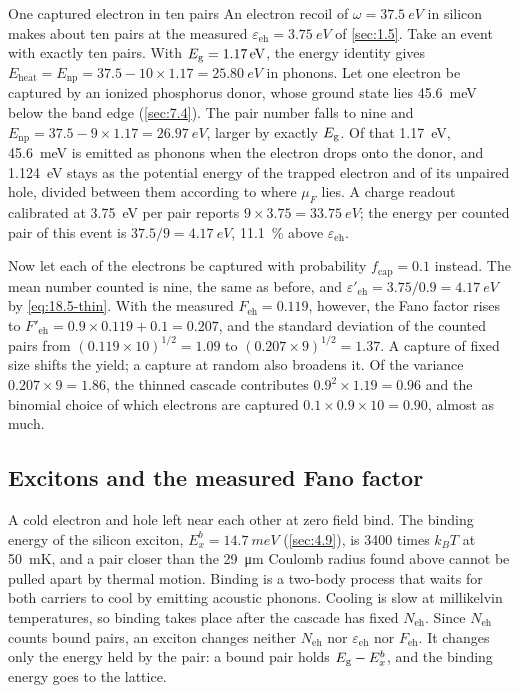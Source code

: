 \begin{workedexample}{One captured electron in ten pairs}\label{we:18-capture}
An electron recoil of $\omega = \SI{37.5}{eV}$ in silicon makes about ten pairs at the measured $\varepsilon_{\mathrm{eh}} = \SI{3.75}{eV}$ of \cref{sec:1.5}. Take an event with exactly ten pairs. With $E_{\mathrm{g}} = \SI{1.17}{eV}$, the energy identity gives $E_{\mathrm{heat}} = E_{\mathrm{np}} = 37.5 - 10\times1.17 = \SI{25.80}{eV}$ in phonons. Let one electron be captured by an ionized phosphorus donor, whose ground state lies \SI{45.6}{meV} below the band edge (\cref{sec:7.4}). The pair number falls to nine and $E_{\mathrm{np}} = 37.5 - 9\times1.17 = \SI{26.97}{eV}$, larger by exactly $E_{\mathrm{g}}$. Of that \SI{1.17}{eV}, \SI{45.6}{meV} is emitted as phonons when the electron drops onto the donor, and \SI{1.124}{eV} stays as the potential energy of the trapped electron and of its unpaired hole, divided between them according to where $\mu_F$ lies. A charge readout calibrated at \SI{3.75}{eV} per pair reports $9\times3.75 = \SI{33.75}{eV}$; the energy per counted pair of this event is $37.5/9 = \SI{4.17}{eV}$, \SI{11.1}{\percent} above $\varepsilon_{\mathrm{eh}}$.

Now let each of the electrons be captured with probability $f_{\mathrm{cap}} = 0.1$ instead. The mean number counted is nine, the same as before, and $\varepsilon'_{\mathrm{eh}} = 3.75/0.9 = \SI{4.17}{eV}$ by \cref{eq:18.5-thin}. With the measured $F_{\mathrm{eh}} = 0.119$, however, the Fano factor rises to $F'_{\mathrm{eh}} = 0.9\times0.119 + 0.1 = 0.207$, and the standard deviation of the counted pairs from $(0.119\times10)^{1/2} = 1.09$ to $(0.207\times9)^{1/2} = 1.37$. A capture of fixed size shifts the yield; a capture at random also broadens it. Of the variance $0.207\times9 = 1.86$, the thinned cascade contributes $0.9^2\times1.19 = 0.96$ and the binomial choice of which electrons are captured $0.1\times0.9\times10 = 0.90$, almost as much.
\end{workedexample}

\subsection{Excitons and the measured Fano factor}\label{sec:18.5-excitons}

A cold electron and hole left near each other at zero field bind. The binding energy of the silicon exciton, $E_x^b = \SI{14.7}{meV}$ (\cref{sec:4.9}), is 3400 times $k_BT$ at \SI{50}{mK}, and a pair closer than the \SI{29}{\micro m} Coulomb radius found above cannot be pulled apart by thermal motion. Binding is a two-body process that waits for both carriers to cool by emitting acoustic phonons. Cooling is slow at millikelvin temperatures, so binding takes place after the cascade has fixed $N_{\mathrm{eh}}$. Since $N_{\mathrm{eh}}$ counts bound pairs, an exciton changes neither $N_{\mathrm{eh}}$ nor $\varepsilon_{\mathrm{eh}}$ nor $F_{\mathrm{eh}}$. It changes only the energy held by the pair: a bound pair holds $E_{\mathrm{g}} - E_x^b$, and the binding energy goes to the lattice.

